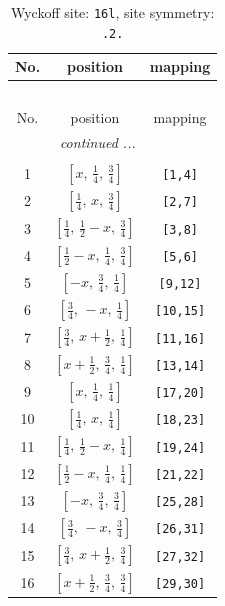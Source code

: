 \documentclass[fleqn,8pt]{jsarticle}
\begin{document}
\renewcommand{\arraystretch}{1.2}
\begin{longtable}{ccc}
\caption{Wyckoff site: {\tt 16l}, site symmetry: {\tt .2.}}
 \\
 \hline \hline
No. & position & mapping \\ \hline \endfirsthead

\multicolumn{2}{l}{\tablename\ \thetable{}} \\
 \hline \hline
No. & position & mapping \\ \hline \endhead

 \hline \hline
\multicolumn{2}{r}{\footnotesize\it continued ...} \\ \endfoot

 \hline \hline
\multicolumn{2}{r}{} \\ \endlastfoot

1 & $\left[ x,\, \frac{1}{4},\, \frac{3}{4} \right]$ & {\tt [1,4]} \\ \hline
2 & $\left[ \frac{1}{4},\, x,\, \frac{3}{4} \right]$ & {\tt [2,7]} \\ \hline
3 & $\left[ \frac{1}{4},\, \frac{1}{2} - x,\, \frac{3}{4} \right]$ & {\tt [3,8]} \\ \hline
4 & $\left[ \frac{1}{2} - x,\, \frac{1}{4},\, \frac{3}{4} \right]$ & {\tt [5,6]} \\ \hline
5 & $\left[ - x,\, \frac{3}{4},\, \frac{1}{4} \right]$ & {\tt [9,12]} \\ \hline
6 & $\left[ \frac{3}{4},\, - x,\, \frac{1}{4} \right]$ & {\tt [10,15]} \\ \hline
7 & $\left[ \frac{3}{4},\, x + \frac{1}{2},\, \frac{1}{4} \right]$ & {\tt [11,16]} \\ \hline
8 & $\left[ x + \frac{1}{2},\, \frac{3}{4},\, \frac{1}{4} \right]$ & {\tt [13,14]} \\ \hline
9 & $\left[ x,\, \frac{1}{4},\, \frac{1}{4} \right]$ & {\tt [17,20]} \\ \hline
10 & $\left[ \frac{1}{4},\, x,\, \frac{1}{4} \right]$ & {\tt [18,23]} \\ \hline
11 & $\left[ \frac{1}{4},\, \frac{1}{2} - x,\, \frac{1}{4} \right]$ & {\tt [19,24]} \\ \hline
12 & $\left[ \frac{1}{2} - x,\, \frac{1}{4},\, \frac{1}{4} \right]$ & {\tt [21,22]} \\ \hline
13 & $\left[ - x,\, \frac{3}{4},\, \frac{3}{4} \right]$ & {\tt [25,28]} \\ \hline
14 & $\left[ \frac{3}{4},\, - x,\, \frac{3}{4} \right]$ & {\tt [26,31]} \\ \hline
15 & $\left[ \frac{3}{4},\, x + \frac{1}{2},\, \frac{3}{4} \right]$ & {\tt [27,32]} \\ \hline
16 & $\left[ x + \frac{1}{2},\, \frac{3}{4},\, \frac{3}{4} \right]$ & {\tt [29,30]} \\
\end{longtable}
\end{document}
